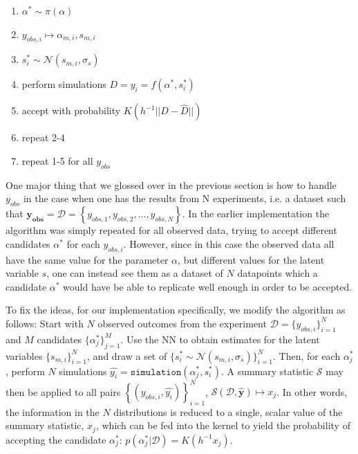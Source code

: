 \documentclass[11pt,a4paper]{article}
\begin{document}
\begin{enumerate}
    \item $\alpha^* \sim \pi(\alpha)$
    \item $y_{obs,i} \mapsto \alpha_{m,i}, s_{m,i}$
    \item $s_i^* \sim \mathcal{N}(s_{m,i}, \sigma_s)$
    \item perform simulations $D = y_i = f(\alpha^*, s_i^*)$
    \item accept with probability $K(h^{-1}||D - \hat{D}||)$
    \item repeat 2-4
    \item repeat 1-5 for all $y_{obs}$
\end{enumerate}


One major thing that we glossed over in the previous section is how to handle $y_{obs}$ in the case when one has the results from N experiments, i.e. a dataset such that $\mathbf{y_{obs}} = \mathcal{D} = \left\{y_{obs,1}, y_{obs,2}, ..., y_{obs,N}\right\}$. In the earlier implementation the algorithm was simply repeated for all observed data, trying to accept different candidates $\alpha^*$ for each $y_{obs,i}$. However, since in this case the observed data all have the same value for the parameter $\alpha$, but different values for the latent variable $s$, one can instead see them as a dataset of $N$ datapoints which a candidate $\alpha^*$ would have be able to replicate well enough in order to be accepted. 

To fix the ideas, for our implementation specifically, we modify the algorithm as follows: Start with $N$ observed outcomes from the experiment $\mathcal{D} = \{y_{obs,i}\}_{i=1}^N$ and $M$ candidates $\{\alpha_j^*\}_{j=1}^M$. Use the NN to obtain estimates for the latent variables $\{s_{m,i}\}_{i=1}^N$, and draw a set of $\{s_i^* \sim \mathcal{N}(s_{m,i}, \sigma_s)\}_{i=1}^N$. Then, for each $\alpha_j^*$, perform $N$ simulations $\hat{y_i} = \texttt{simulation}(\alpha_j^*, s_i^*)$. A summary statistic $\mathcal{S}$ may then be applied to all pairs $\left\{(y_{obs,i}, \hat{y_i})\right\}_{i=1}^N$, $\mathcal{S}(\mathcal{D}, \mathbf{\hat{y}}) \mapsto x_j$. In other words, the information in the $N$ distributions is reduced to a single, scalar value of the summary statistic, $x_j$, which can be fed into the kernel to yield the probability of accepting the candidate $\alpha_j^*$: $p(\alpha_j^* \left. \vert \right. \mathcal{D} ) =  K(h^{-1}x_j)$. 



\end{document}
